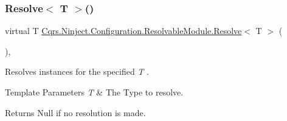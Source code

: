 \subsubsection{\texorpdfstring{Resolve$<$ T $>$()}{Resolve< T >()}}
{\footnotesize\ttfamily virtual T \hyperlink{classCqrs_1_1Ninject_1_1Configuration_1_1ResolvableModule_a182fa5666c70e6871aa371fc81fb788d_a182fa5666c70e6871aa371fc81fb788d}{Cqrs.\+Ninject.\+Configuration.\+Resolvable\+Module.\+Resolve}$<$ T $>$ (\begin{DoxyParamCaption}{ }\end{DoxyParamCaption})\hspace{0.3cm}{\ttfamily [protected]}, {\ttfamily [virtual]}}



Resolves instances for the specified {\itshape T} . 


\begin{DoxyTemplParams}{Template Parameters}
{\em T} & The Type to resolve.\\
\hline
\end{DoxyTemplParams}
\begin{DoxyReturn}{Returns}
Null if no resolution is made.
\end{DoxyReturn}
